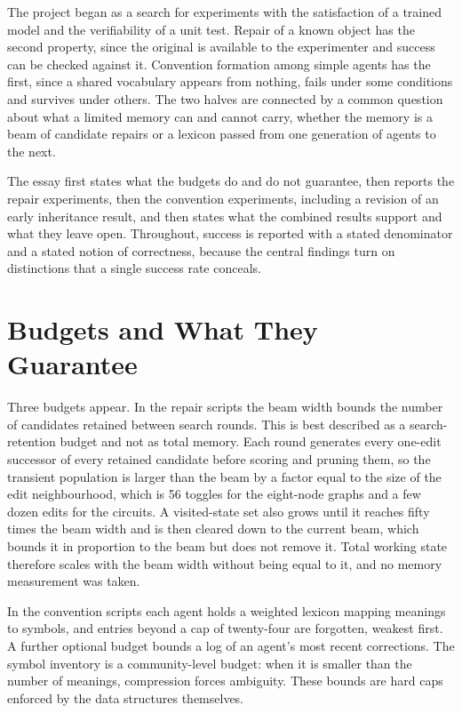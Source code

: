 \documentclass[11pt]{article}
\begin{document}
The project began as a search for experiments with the satisfaction of a trained model and the verifiability of a unit test. Repair of a known object has the second property, since the original is available to the experimenter and success can be checked against it. Convention formation among simple agents has the first, since a shared vocabulary appears from nothing, fails under some conditions and survives under others. The two halves are connected by a common question about what a limited memory can and cannot carry, whether the memory is a beam of candidate repairs or a lexicon passed from one generation of agents to the next.

The essay first states what the budgets do and do not guarantee, then reports the repair experiments, then the convention experiments, including a revision of an early inheritance result, and then states what the combined results support and what they leave open. Throughout, success is reported with a stated denominator and a stated notion of correctness, because the central findings turn on distinctions that a single success rate conceals.

\section{Budgets and What They Guarantee}

Three budgets appear. In the repair scripts the beam width bounds the number of candidates retained between search rounds. This is best described as a search-retention budget and not as total memory. Each round generates every one-edit successor of every retained candidate before scoring and pruning them, so the transient population is larger than the beam by a factor equal to the size of the edit neighbourhood, which is 56 toggles for the eight-node graphs and a few dozen edits for the circuits. A visited-state set also grows until it reaches fifty times the beam width and is then cleared down to the current beam, which bounds it in proportion to the beam but does not remove it. Total working state therefore scales with the beam width without being equal to it, and no memory measurement was taken.

In the convention scripts each agent holds a weighted lexicon mapping meanings to symbols, and entries beyond a cap of twenty-four are forgotten, weakest first. A further optional budget bounds a log of an agent's most recent corrections. The symbol inventory is a community-level budget: when it is smaller than the number of meanings, compression forces ambiguity. These bounds are hard caps enforced by the data structures themselves.
\end{document}
